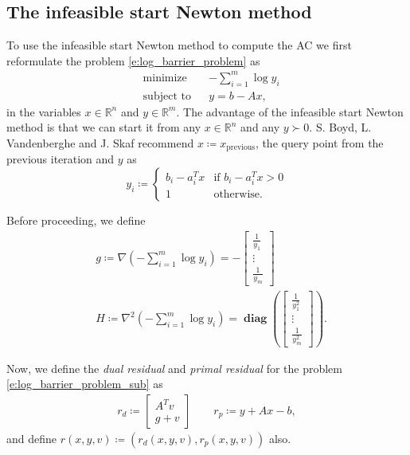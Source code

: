 \documentclass[11pt]{amsart}
\theoremstyle{definition}
\theoremstyle{remark}
\newcommand{\transpose}{T}
\DeclareMathOperator{\diag}{\textbf{diag}}
\begin{document}
    \subsection{The infeasible start Newton method}\label{ss:infeasible} To use the infeasible start Newton method to compute the AC we first reformulate the problem \eqref{e:log_barrier_problem} as 
    \begin{equation}\label{e:log_barrier_problem_sub}
        \begin{aligned}
        & \text{minimize} && -\sum_{i=1}^m \log{y_i}  \\
        & \text{subject to} && y = b - Ax, 
        \end{aligned}
    \end{equation}
    in the variables $x \in \mathbb{R}^n$ and $y \in \mathbb{R}^m$. The advantage of the infeasible start Newton method is that we can start it from any $x \in \mathbb{R}^n$ and any $y \succ 0$. S. Boyd, L. Vandenberghe and J. Skaf \cite[Section 2]{BVS08} recommend $x \coloneqq x_\text{previous}$, the query point from the previous iteration and $y$ as 
    \begin{equation*}
        y_i \coloneqq
        \begin{cases} 
            b_i - a_i^\transpose x &\text{if $b_i - a_i^\transpose x > 0$}  \\
            1 &\text{otherwise.}
        \end{cases}     
    \end{equation*} 

    Before proceeding, we define 
    \begin{align*}
        &g \coloneqq \nabla \left( -\sum_{i=1}^m \log{y_i} \right) = 
        - \begin{bmatrix}
            \frac{1}{y_1} \\
            \vdots \\
            \frac{1}{y_m}
        \end{bmatrix} \\
        &H \coloneqq \nabla^2 \left( -\sum_{i=1}^m \log{y_i} \right) = \diag\left(\begin{bmatrix}
            \frac{1}{y_1^2} \\
            \vdots \\
            \frac{1}{y_m^2}
        \end{bmatrix} \right). 
    \end{align*} 

    Now, we define the \emph{dual residual} and \emph{primal residual} for the problem \eqref{e:log_barrier_problem_sub} as
    \begin{align*}
        r_d \coloneqq
        \begin{bmatrix}
            A^\transpose v \\
            g + v
        \end{bmatrix} \quad\quad r_p \coloneqq y + Ax - b, 
    \end{align*}
    and define $r(x, y, v) \coloneqq (r_d(x, y, v), r_p(x, y, v))$ also.
\end{document}
